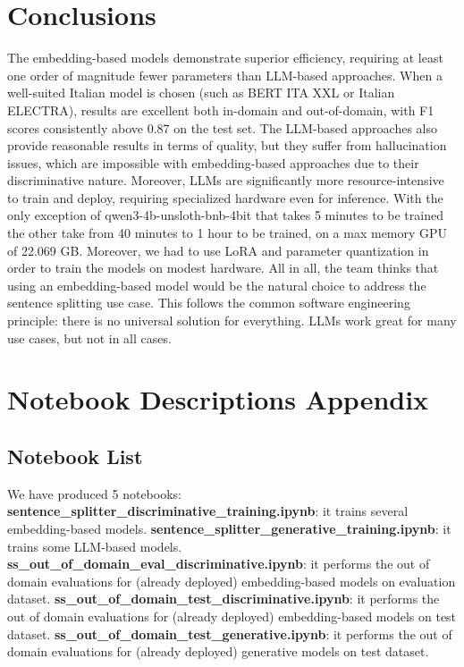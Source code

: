 \documentclass[11pt]{article}
\begin{document}
\section{Conclusions}
The embedding-based models demonstrate superior efficiency, requiring at least one order of magnitude fewer parameters than LLM-based approaches. When a well-suited Italian model is chosen (such as BERT ITA XXL or Italian ELECTRA), results are excellent both in-domain and out-of-domain, with F1 scores consistently above 0.87 on the test set. \newline 
The LLM-based approaches also provide reasonable results in terms of quality, but they suffer from hallucination issues, which are impossible with embedding-based approaches due to their discriminative nature. \newline Moreover, LLMs are significantly more resource-intensive to train and deploy, requiring specialized hardware even for inference. \newline With the only exception of qwen3-4b-unsloth-bnb-4bit that takes 5 minutes to be trained the other take from 40 minutes to 1 hour to be trained, on a max memory GPU of 22.069 GB. \newline Moreover, we had to use LoRA and parameter quantization in order to train the models on modest hardware. \newline All in all, the team thinks that using an embedding-based model would be the natural choice to address the sentence splitting use case. \newline This follows the common software engineering principle: there is no universal solution for everything. LLMs work great for many use cases, but not in all cases.

\appendix

\section{Notebook Descriptions Appendix}
\label{sec:appendix1}

\subsection{Notebook  List}
We have produced 5 notebooks:
\noindent \textbf{sentence\_splitter\_discriminative\_training.ipynb}: it trains several embedding-based models.    
\noindent  \textbf{sentence\_splitter\_generative\_training.ipynb}: it trains some LLM-based models.
\noindent \textbf{ss\_out\_of\_domain\_eval\_discriminative.ipynb}: it performs the out of domain evaluations for (already deployed) embedding-based models on evaluation dataset.    
\noindent \textbf{ss\_out\_of\_domain\_test\_discriminative.ipynb}: it performs the out of domain evaluations for (already deployed) embedding-based models on test dataset.
\noindent \textbf{ss\_out\_of\_domain\_test\_generative.ipynb}: it performs the out of domain evaluations for (already deployed) generative models on test dataset.
\end{document}

